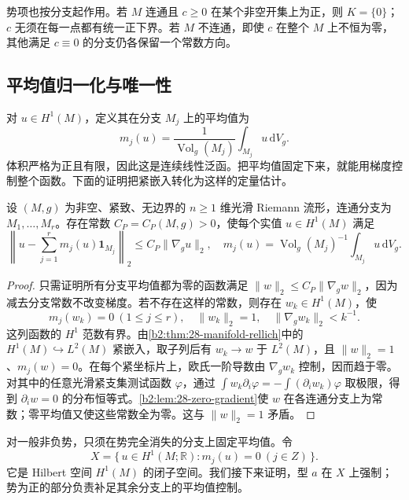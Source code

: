 势项也按分支起作用。若 \(M\) 连通且 \(c\geq0\) 在某个非空开集上为正，则 \(K=\{0\}\)；\(c\) 无须在每一点都有统一正下界。若 \(M\) 不连通，即使 \(c\) 在整个 \(M\) 上不恒为零，其他满足 \(c\equiv0\) 的分支仍各保留一个常数方向。

\subsection{平均值归一化与唯一性}
\label{b2:subsec:260303}

对 \(u\in H^1(M)\)，定义其在分支 \(M_j\) 上的平均值为
\[
 m_j(u)=\frac1{\operatorname{Vol}_g(M_j)}
             \int_{M_j}u\,\mathrm dV_g.
\]
体积严格为正且有限，因此这是连续线性泛函。把平均值固定下来，就能用梯度控制整个函数。下面的证明把紧嵌入转化为这样的定量估计。

\begin{lemma}
\label{b2:lemma:26-component-poincare}
设 \((M,g)\) 为非空、紧致、无边界的 \(n\geq1\) 维光滑 Riemann 流形，连通分支为 \(M_1,\ldots,M_r\)。存在常数 \(C_P=C_P(M,g)>0\)，使每个实值 \(u\in H^1(M)\) 满足
\begin{equation}
\label{b2:eq:26-component-poincare}
 \left\|u-\sum_{j=1}^rm_j(u)\mathbf1_{M_j}\right\|_2
 \leq C_P\|\nabla_g u\|_2,
 \quad
 m_j(u)=\operatorname{Vol}_g(M_j)^{-1}\int_{M_j}u\,\mathrm dV_g.
\end{equation}
\end{lemma}
\begin{proof}
只需证明所有分支平均值都为零的函数满足
\(\|w\|_2\leq C_P\|\nabla_gw\|_2\)，因为减去分支常数不改变梯度。若不存在这样的常数，则存在 \(w_k\in H^1(M)\)，使
\[
 m_j(w_k)=0\ (1\leq j\leq r),
 \quad \|w_k\|_2=1,
 \quad \|\nabla_gw_k\|_2<k^{-1}.
\]
这列函数的 \(H^1\) 范数有界。由\cref{b2:thm:28-manifold-rellich}中的 \(H^1(M)\hookrightarrow L^2(M)\) 紧嵌入，取子列后有 \(w_k\to w\) 于 \(L^2(M)\)，且 \(\|w\|_2=1\)、\(m_j(w)=0\)。在每个紧坐标片上，欧氏一阶导数由 \(\nabla_gw_k\) 控制，因而趋于零。对其中的任意光滑紧支集测试函数 \(\varphi\)，通过
\(\int w_k\partial_i\varphi=-\int(\partial_iw_k)\varphi\)
取极限，得到 \(\partial_iw=0\) 的分布恒等式。\cref{b2:lem:28-zero-gradient}使 \(w\) 在各连通分支上为常数；零平均值又使这些常数全为零。这与 \(\|w\|_2=1\) 矛盾。
\end{proof}

对一般非负势，只须在势完全消失的分支上固定平均值。令
\[
 X=\{\,u\in H^1(M;\mathbb R):m_j(u)=0\ (j\in Z)\,\}.
\]
它是 Hilbert 空间 \(H^1(M)\) 的闭子空间。我们接下来证明，型 \(a\) 在 \(X\) 上强制；势为正的部分负责补足其余分支上的平均值控制。

